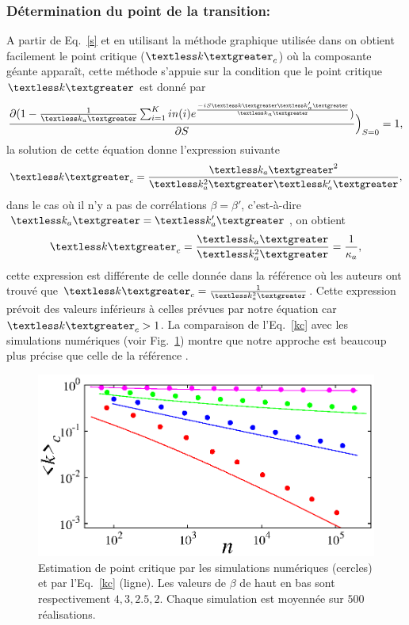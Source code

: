 \subsubsection{Détermination du point de la transition:}
A partir de Eq.~\eqref{s} et en utilisant la méthode graphique utilisée dans \cite{Newman2010-403} on obtient facilement le point critique ($\km_c$) où la composante géante apparaît, cette méthode s'appuie sur la condition que le point critique $\km$ est donné par 
\begin{equation}
\frac{\partial (1-\frac{1}{\kma}\sum_{i=1}^Kin(i)e^{\frac{-iS\km\kmap}{\kma}})}{\partial S}\Big)_{S=0}=1,
\end{equation}
la solution de cette équation  donne l'expression suivante
\begin{equation}
\km_c=\frac{\kma^2}{\kmaa\kmap},
\end{equation}
dans le cas où il n'y a pas de corrélations $\beta=\beta'$, c'est-à-dire $\kma=\kmap$, on obtient 
\begin{equation}
\km_c=\frac{\kma}{\kmaa}=\frac{1}{\kappa_a},
\label{kc}
\end{equation}
cette expression est différente de celle donnée dans la référence \cite{Cho-al2010} où les auteurs ont trouvé que $\km_c=\frac{1}{\kmaa}$. Cette expression prévoit des valeurs inférieurs à celles prévues par notre équation car $\km_c>1$. La comparaison  de l'Eq.~\eqref{kc} avec les simulations numériques (voir Fig.~\ref{PC}) montre que notre approche est beaucoup plus précise que celle de la référence \cite{Cho-al2010}.\\
\begin{figure}[h!]
	\centering
	\includegraphics[scale=1.2]{./figures/fig-PC}
	\caption{Estimation de point critique par les simulations numériques (cercles) et par l'Eq.~\eqref{kc} (ligne). Les valeurs de $\beta$ de haut en bas sont respectivement $4,3,2.5,2$. Chaque simulation est moyennée sur $500$ réalisations. }
	\label{PC}
\end{figure}

